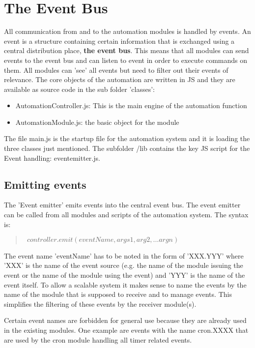 \section{The Event Bus}

All communication from and to the automation modules is handled by events. An event 
is a structure containing certain information that is exchanged using a central 
distribution place, {\bf the event bus}. This means that all modules can send events 
to the event bus and can listen to event in order to execute commands on them. All 
modules can 'see' all events but need to filter out their events of relevance.  The 
core objects of the automation are written in JS and they are available as source 
code in the sub folder 'classes':

\begin{itemize}
\item AutomationController.js: This is the main engine of the automation function
\item AutomationModule.js: the basic object for the module
\end{itemize}

The file main.js is the startup file for the automation system and it is loading the three 
classes just mentioned. The subfolder /lib contains the key JS script for the Event 
handling: eventemitter.js.

\subsection{Emitting events}

The 'Event emitter' emits events into the central event bus. The event emitter can 
be called from all modules and scripts of the automation system. The syntax is:

\begin{quote}
{\tt  
$controller.emit(eventName, args1,arg2,...argn)$
}
\end{quote}

The event name 'eventName' has to be noted in the form of 'XXX.YYY' where 'XXX' is the name 
of the event source (e.g. the name of the module issuing the event or the name of the 
module using the event) and 'YYY' is the name of the event itself.  To allow a scalable 
system it makes sense to name the events by the name of the module that is supposed to 
receive and to manage events. This simplifies the filtering of these events by the 
receiver module(s).

Certain event names are forbidden for general use because they are already used in the 
existing modules. One example are events with the name cron.XXXX that are used by the 
cron module handling all timer related events.

